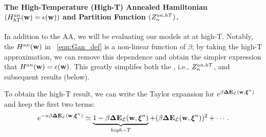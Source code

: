{\paragraph{The High-Temperature (High-T) Annealed Hamiltonian $(H^{an}_{hT}({\mathbf{w}})=\epsilon({\mathbf{w}}))$ and Partition Function $(Z^{an,hT}_{n})$. }
In addition to the AA, we will be evaluating our models at at high-T.
Notably, the \AnnealedHamiltonian $H^{an}({\mathbf{w}})$ in \EQN~\ref{eqn:Gan_def} is a non-linear function of $\beta$; by
taking the high-T approximation, we can remove this dependence and obtain
the simpler expression that $H^{an}({\mathbf{w}})=\epsilon({\mathbf{w}})$.  This greatly simplifes both
the \PartitionFunction, i.e.,  $Z^{an,hT}_{n}$, and subsequent results (below).


To obtain the high-T result, we can write the Taylor expansion for $e^{\beta\mathbf{\Delta {E}}_{\mathcal{L}}(\mathbf{w}, \boldsymbol{\xi}^{n})}$ and keep
the first two terms:
\begin{align}
  e^{-n\beta\mathbf{\Delta {E}}_{\mathcal{L}}(\mathbf{w}, \boldsymbol{\xi}^{n})} \simeq \underbrace{1 - \beta\mathbf{\Delta {E}}_{\mathcal{L}}(\mathbf{w}, \boldsymbol{\xi}^{n})}_{high-T}+ (\beta\mathbf{\Delta {E}}_{\mathcal{L}}(\mathbf{w}, \boldsymbol{\xi}^{n}))^{2} + \cdots  .
\end{align}

}

